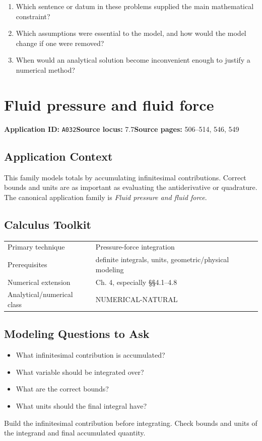 \documentclass[11pt]{book}
\newcommand{\pid}[1]{\texttt{#1}}
\begin{document}
\begin{reflectionbox}\begin{enumerate}
\item Which sentence or datum in these problems supplied the main mathematical constraint?
\item Which assumptions were essential to the model, and how would the model change if one were removed?
\item When would an analytical solution become inconvenient enough to justify a numerical method?
\end{enumerate}\end{reflectionbox}
\chapter{Fluid pressure and fluid force}\label{app:A032}
\textbf{Application ID:} \pid{A032}\quad \textbf{Source locus:} 7.7\quad \textbf{Source pages:} 506–514, 546, 549
\section*{Application Context}
This family models totals by accumulating infinitesimal contributions. Correct bounds and units are as important as evaluating the antiderivative or quadrature. The canonical application family is \emph{Fluid pressure and fluid force}.
\section*{Calculus Toolkit}
\begin{tabularx}{\textwidth}{@{}lX@{}}\toprule
Primary technique & Pressure-force integration \\
Prerequisites & definite integrals, units, geometric/physical modeling \\
Numerical extension & Ch. 4, especially §§4.1–4.8 \\
Analytical/numerical class & NUMERICAL-NATURAL \\
\bottomrule\end{tabularx}
\section*{Modeling Questions to Ask}\begin{itemize}
\item What infinitesimal contribution is accumulated?
\item What variable should be integrated over?
\item What are the correct bounds?
\item What units should the final integral have?
\end{itemize}
\begin{errorbox}Build the infinitesimal contribution before integrating. Check bounds and units of the integrand and final accumulated quantity.\end{errorbox}
\end{document}
